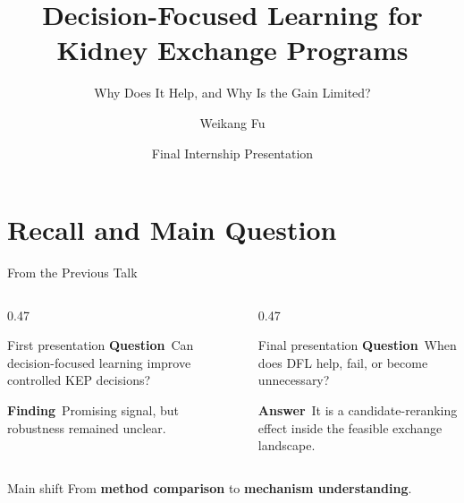 \documentclass[aspectratio=169,10pt]{beamer}
\title{Decision-Focused Learning for Kidney Exchange Programs}
\subtitle{Why Does It Help, and Why Is the Gain Limited?}
\author{Weikang Fu}
\institute{MILA \\ Universit\'{e} de Montr\'{e}al}
\date{Final Internship Presentation}
\begin{document}

\begin{frame}
  \titlepage
\end{frame}

\section{Recall and Main Question}

\begin{frame}{From the Previous Talk}
  \small
  \begin{columns}[T,onlytextwidth]
    \begin{column}{0.47\textwidth}
      \begin{block}{First presentation}
        \textbf{Question}\
        Can decision-focused learning improve controlled KEP decisions?

        \vspace{0.7em}
        \textbf{Finding}\
        Promising signal, but robustness remained unclear.
      \end{block}
    \end{column}

    \begin{column}{0.47\textwidth}
      \begin{exampleblock}{Final presentation}
        \textbf{Question}\
        When does DFL help, fail, or become unnecessary?

        \vspace{0.7em}
        \textbf{Answer}\
        It is a candidate-reranking effect inside the feasible exchange landscape.
      \end{exampleblock}
    \end{column}
  \end{columns}

  \vspace{0.8em}
  \begin{alertblock}{Main shift}
    \centering
    From \textbf{method comparison} to \textbf{mechanism understanding}.
  \end{alertblock}
\end{frame}
\end{document}
